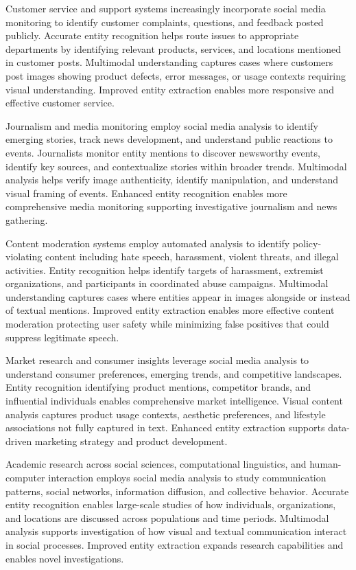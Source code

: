 \documentclass[12pt,a4paper]{report}
\begin{document}
Customer service and support systems increasingly incorporate social media monitoring to identify customer complaints, questions, and feedback posted publicly. Accurate entity recognition helps route issues to appropriate departments by identifying relevant products, services, and locations mentioned in customer posts. Multimodal understanding captures cases where customers post images showing product defects, error messages, or usage contexts requiring visual understanding. Improved entity extraction enables more responsive and effective customer service.

Journalism and media monitoring employ social media analysis to identify emerging stories, track news development, and understand public reactions to events. Journalists monitor entity mentions to discover newsworthy events, identify key sources, and contextualize stories within broader trends. Multimodal analysis helps verify image authenticity, identify manipulation, and understand visual framing of events. Enhanced entity recognition enables more comprehensive media monitoring supporting investigative journalism and news gathering.

Content moderation systems employ automated analysis to identify policy-violating content including hate speech, harassment, violent threats, and illegal activities. Entity recognition helps identify targets of harassment, extremist organizations, and participants in coordinated abuse campaigns. Multimodal understanding captures cases where entities appear in images alongside or instead of textual mentions. Improved entity extraction enables more effective content moderation protecting user safety while minimizing false positives that could suppress legitimate speech.

Market research and consumer insights leverage social media analysis to understand consumer preferences, emerging trends, and competitive landscapes. Entity recognition identifying product mentions, competitor brands, and influential individuals enables comprehensive market intelligence. Visual content analysis captures product usage contexts, aesthetic preferences, and lifestyle associations not fully captured in text. Enhanced entity extraction supports data-driven marketing strategy and product development.

Academic research across social sciences, computational linguistics, and human-computer interaction employs social media analysis to study communication patterns, social networks, information diffusion, and collective behavior. Accurate entity recognition enables large-scale studies of how individuals, organizations, and locations are discussed across populations and time periods. Multimodal analysis supports investigation of how visual and textual communication interact in social processes. Improved entity extraction expands research capabilities and enables novel investigations.
\end{document}
